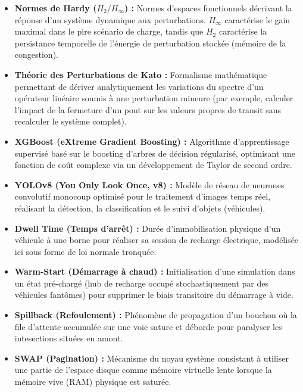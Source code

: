 \documentclass[11pt, a4paper]{article}
\begin{document}
\begin{itemize}
  \textbf{Constante de Kreiss (\(K\)) :} Métrique caractérisant
  l'amplitude maximale de l'amplification transitoire des perturbations
  avant le retour à l'équilibre asymptotique, traduisant la
  vulnérabilité d'un réseau aux embouteillages en cascade.
\item
  \textbf{Normes de Hardy (\(H_2 / H_\infty\)) :} Normes d'espaces
  fonctionnels décrivant la réponse d'un système dynamique aux
  perturbations. \(H_\infty\) caractérise le gain maximal dans le pire
  scénario de charge, tandis que \(H_2\) caractérise la persistance
  temporelle de l'énergie de perturbation stockée (mémoire de la
  congestion).
\item
  \textbf{Théorie des Perturbations de Kato :} Formalisme mathématique
  permettant de dériver analytiquement les variations du spectre d'un
  opérateur linéaire soumis à une perturbation mineure (par exemple,
  calculer l'impact de la fermeture d'un pont sur les valeurs propres de
  transit sans recalculer le système complet).
\item
  \textbf{XGBoost (eXtreme Gradient Boosting) :} Algorithme
  d'apprentissage supervisé basé sur le boosting d'arbres de décision
  régularisé, optimisant une fonction de coût complexe via un
  développement de Taylor de second ordre.
\item
  \textbf{YOLOv8 (You Only Look Once, v8) :} Modèle de réseau de
  neurones convolutif monocoup optimisé pour le traitement d'images
  temps réel, réalisant la détection, la classification et le suivi
  d'objets (véhicules).
\item
  \textbf{Dwell Time (Temps d'arrêt) :} Durée d'immobilisation physique
  d'un véhicule à une borne pour réaliser sa session de recharge
  électrique, modélisée ici sous forme de loi normale tronquée.
\item
  \textbf{Warm-Start (Démarrage à chaud) :} Initialisation d'une
  simulation dans un état pré-chargé (hub de recharge occupé
  stochastiquement par des véhicules fantômes) pour supprimer le biais
  transitoire du démarrage à vide.
\item
  \textbf{Spillback (Refoulement) :} Phénomène de propagation d'un
  bouchon où la file d'attente accumulée sur une voie sature et déborde
  pour paralyser les intesections situées en amont.
\item
  \textbf{SWAP (Pagination) :} Mécanisme du noyau système consistant à
  utiliser une partie de l'espace disque comme mémoire virtuelle lente
  lorsque la mémoire vive (RAM) physique est saturée.
\end{itemize}
\end{document}
